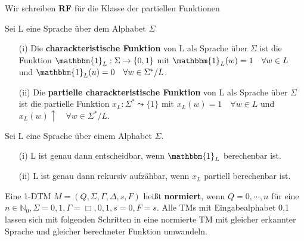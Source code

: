   Wir schreiben \textbf{RF} für die Klasse der partiellen Funktionen

  Sei L eine Sprache über dem Alphabet \(\Sigma\)
  \begin{itemize}
    \item [(i)] Die \textbf{charackteristische Funktion} von L als Sprache über \(\Sigma\) ist die Funktion \(\mathbbm{1}_L : \Sigma \rightarrow \{0, 1\}\) mit \(\mathbbm{1}_L(w) = 1 \quad \forall w \in L\) und \(\mathbbm{1}_L (u) = 0 \quad \forall w \in \Sigma^* / L\).
    \item [(ii)] Die \textbf{ partielle charackteristische Funktion} von L als Sprache über \(\Sigma\) ist die partielle Funktion \(x_L : \Sigma^* \leadsto \{1\}\) mit \(x_L(w) = 1 \quad \forall w \in L\) und \(x_L(w) \uparrow \quad \forall w \in \Sigma^* / L\). 
  \end{itemize}

  Sei L eine Sprache über einem Alphabet \(\Sigma\). 
  \begin{itemize}
    \item [(i)] L ist genau dann entscheidbar, wenn \(\mathbbm{1}_L\) berechenbar ist.
    \item [(ii)] L ist genau dann rekursiv aufzähbar, wenn \(x_L\) partiell berechenbar ist.
  \end{itemize}

\newpage

  Eine 1-DTM \(M = (Q, \Sigma, \Gamma, \Delta, s, F)\) heißt \textbf{normiert}, wenn \(Q = {0,\cdots, n}\) für eine \(n \in \mathbb{N}_{0}, \Sigma = {0, 1}, \Gamma = {\Box, 0, 1}, s = 0, F = {s}\). Alle TMs mit Eingabealphabet {0,1} lassen sich mit folgenden Schritten in eine normierte TM mit gleicher erkannter Sprache und gleicher berechneter Funktion umwandeln.

